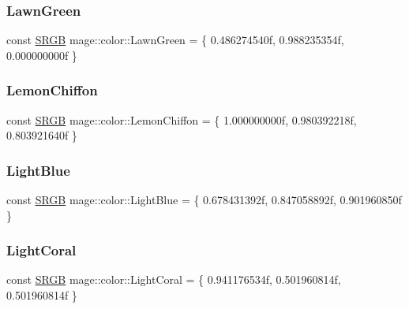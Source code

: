 \subsubsection{\texorpdfstring{Lawn\+Green}{LawnGreen}}
{\footnotesize\ttfamily const \hyperlink{structmage_1_1_s_r_g_b}{S\+R\+GB} mage\+::color\+::\+Lawn\+Green = \{ 0.\+486274540f, 0.\+988235354f, 0.\+000000000f \}}

\hypertarget{namespacemage_1_1color_a45dfec58d7638bc3cd1d2eb782feec97}{}\label{namespacemage_1_1color_a45dfec58d7638bc3cd1d2eb782feec97} 
\subsubsection{\texorpdfstring{Lemon\+Chiffon}{LemonChiffon}}
{\footnotesize\ttfamily const \hyperlink{structmage_1_1_s_r_g_b}{S\+R\+GB} mage\+::color\+::\+Lemon\+Chiffon = \{ 1.\+000000000f, 0.\+980392218f, 0.\+803921640f \}}

\hypertarget{namespacemage_1_1color_adba4da561e129c171e1e72fa11395add}{}\label{namespacemage_1_1color_adba4da561e129c171e1e72fa11395add} 
\subsubsection{\texorpdfstring{Light\+Blue}{LightBlue}}
{\footnotesize\ttfamily const \hyperlink{structmage_1_1_s_r_g_b}{S\+R\+GB} mage\+::color\+::\+Light\+Blue = \{ 0.\+678431392f, 0.\+847058892f, 0.\+901960850f \}}

\hypertarget{namespacemage_1_1color_a115b4380958b3301e2c1d00c1e89bc72}{}\label{namespacemage_1_1color_a115b4380958b3301e2c1d00c1e89bc72} 
\subsubsection{\texorpdfstring{Light\+Coral}{LightCoral}}
{\footnotesize\ttfamily const \hyperlink{structmage_1_1_s_r_g_b}{S\+R\+GB} mage\+::color\+::\+Light\+Coral = \{ 0.\+941176534f, 0.\+501960814f, 0.\+501960814f \}}

\hypertarget{namespacemage_1_1color_aa3a415c07db596251af383602d707b25}{}\label{namespacemage_1_1color_aa3a415c07db596251af383602d707b25} 
